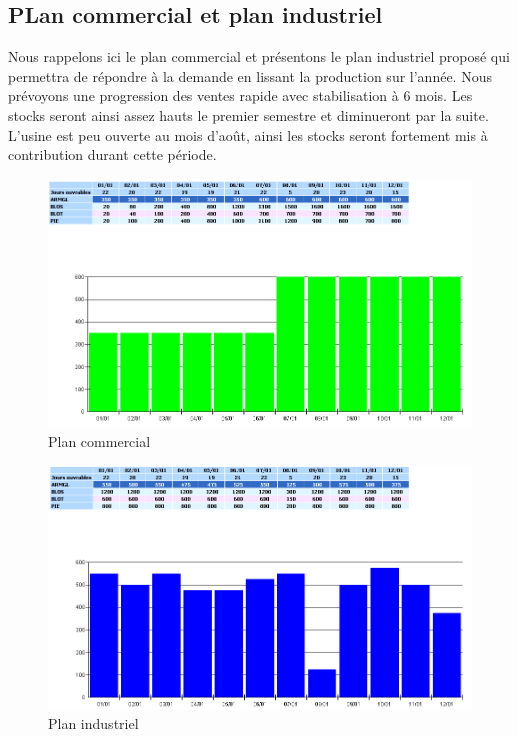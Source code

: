 \documentclass[a4paper]{../TPInsa}
\begin{document}
	\subsection{PLan commercial et plan industriel}
	
	Nous rappelons ici le plan commercial et présentons le plan industriel proposé qui permettra de répondre à la demande en lissant la production sur l'année. Nous prévoyons une progression des ventes rapide avec stabilisation à 6 mois. Les stocks seront ainsi assez hauts le premier semestre et diminueront par la suite. L'usine est peu ouverte au mois d’août, ainsi les stocks seront fortement mis à contribution durant cette période.
	
	\begin{figure}[H]
	\centering
	\includegraphics[scale=0.6]{captures/plan_commercial.PNG}
	\caption{Plan commercial}
	\end{figure}
	
	\begin{figure}[H]
	\centering
	\includegraphics[scale=0.6]{captures/plan_industriel.PNG}
	\caption{Plan industriel}
	\end{figure}
	
\end{document}
